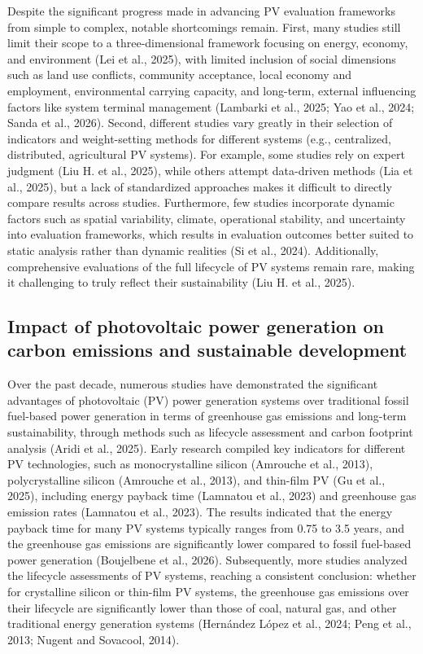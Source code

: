 \documentclass{article}
\begin{document}
	Despite the significant progress made in advancing PV evaluation frameworks from simple to complex, notable shortcomings remain. First, many studies still limit their scope to a three-dimensional framework focusing on energy, economy, and environment (Lei et al., 2025), with limited inclusion of social dimensions such as land use conflicts, community acceptance, local economy and employment, environmental carrying capacity, and long-term, external influencing factors like system terminal management (Lambarki et al., 2025; Yao et al., 2024; Sanda et al., 2026). Second, different studies vary greatly in their selection of indicators and weight-setting methods for different systems (e.g., centralized, distributed, agricultural PV systems). For example, some studies rely on expert judgment (Liu H. et al., 2025), while others attempt data-driven methods (Lia et al., 2025), but a lack of standardized approaches makes it difficult to directly compare results across studies. Furthermore, few studies incorporate dynamic factors such as spatial variability, climate, operational stability, and uncertainty into evaluation frameworks, which results in evaluation outcomes better suited to static analysis rather than dynamic realities (Si et al., 2024). Additionally, comprehensive evaluations of the full lifecycle of PV systems remain rare, making it challenging to truly reflect their sustainability (Liu H. et al., 2025).
	
	\subsection{Impact of photovoltaic power generation on carbon emissions and sustainable development}
	Over the past decade, numerous studies have demonstrated the significant advantages of photovoltaic (PV) power generation systems over traditional fossil fuel-based power generation in terms of greenhouse gas emissions and long-term sustainability, through methods such as lifecycle assessment and carbon footprint analysis (Aridi et al., 2025). Early research compiled key indicators for different PV technologies, such as monocrystalline silicon (Amrouche et al., 2013), polycrystalline silicon (Amrouche et al., 2013), and thin-film PV (Gu et al., 2025), including energy payback time (Lamnatou et al., 2023) and greenhouse gas emission rates (Lamnatou et al., 2023). The results indicated that the energy payback time for many PV systems typically ranges from 0.75 to 3.5 years, and the greenhouse gas emissions are significantly lower compared to fossil fuel-based power generation (Boujelbene et al., 2026). Subsequently, more studies analyzed the lifecycle assessments of PV systems, reaching a consistent conclusion: whether for crystalline silicon or thin-film PV systems, the greenhouse gas emissions over their lifecycle are significantly lower than those of coal, natural gas, and other traditional energy generation systems (Hernández López et al., 2024; Peng et al., 2013; Nugent and Sovacool, 2014).
	
\end{document}
